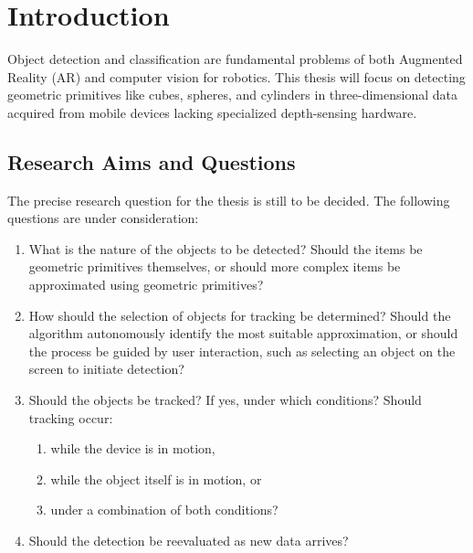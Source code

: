 
\chapter{Introduction}
Object detection and classification are fundamental problems of both Augmented Reality (AR) and computer vision for robotics.
This thesis will focus on detecting geometric primitives like cubes, spheres, and cylinders in three-dimensional data acquired from mobile devices lacking specialized depth-sensing hardware.


\section{Research Aims and Questions}

The precise research question for the thesis is still to be decided.
The following questions are under consideration:
\begin{enumerate}
    \item What is the nature of the objects to be detected? Should the items be geometric primitives themselves, or should more complex items be approximated using geometric primitives?
    \item How should the selection of objects for tracking be determined? Should the algorithm autonomously identify the most suitable approximation, or should the process be guided by user interaction, such as selecting an object on the screen to initiate detection?
    \item Should the objects be tracked? If yes, under which conditions? Should tracking occur:
    \begin{enumerate}
        \item while the device is in motion,
        \item while the object itself is in motion, or
        \item under a combination of both conditions?
    \end{enumerate}
    \item Should the detection be reevaluated as new data arrives?
\end{enumerate}